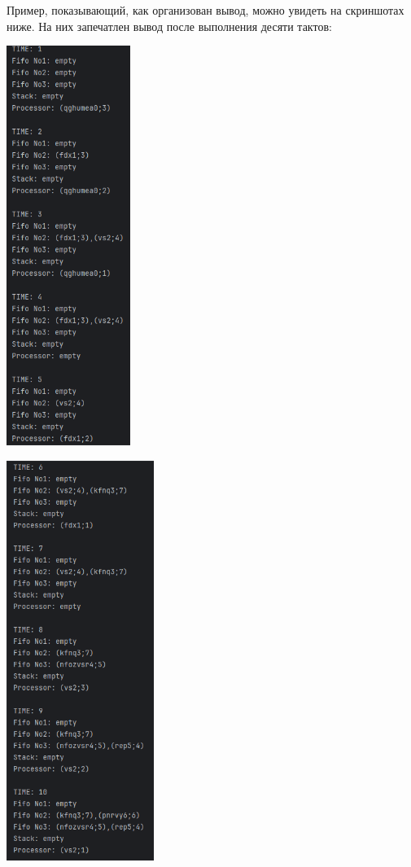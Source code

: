 \documentclass[12pt]{article}
\begin{document}
{	 
	
	Пример, показывающий, как организован вывод, можно увидеть на скриншотах ниже. На них запечатлен вывод после выполнения десяти тактов: 
	
	\parbox[с][130mm][c]{50mm}{
		\includegraphics[height=130mm]{images/task1.png}
	}
	\hspace{1cm}
	\parbox[с][130mm][c]{60mm}{
		\includegraphics[height=130mm]{images/task2.png}
	}
	
}
\end{document}
